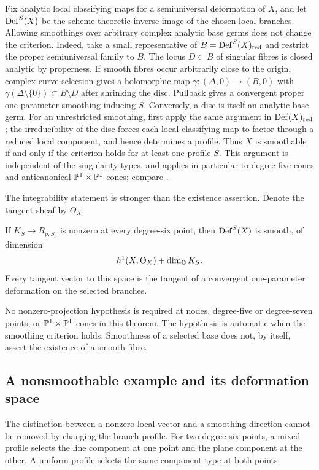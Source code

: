 Fix analytic local classifying maps for a semiuniversal deformation of
$X$, and let $\operatorname{Def}^S(X)$ be the scheme-theoretic inverse image of the
chosen local branches.  Allowing smoothings over arbitrary complex analytic
base germs does not change the criterion.  Indeed, take a small
representative of $B=\operatorname{Def}^S(X)_{\mathrm{red}}$ and restrict the
proper semiuniversal family to $B$.  The locus $D\subset B$ of singular
fibres is closed analytic by properness.  If smooth fibres occur
arbitrarily close to the origin, complex curve selection
\cite[Lem.~2.36]{LeMassey05} gives a holomorphic map
$\gamma:(\Delta,0)\to(B,0)$ with
$\gamma(\Delta\setminus\{0\})\subset B\setminus D$ after shrinking
the disc.  Pullback gives a convergent proper one-parameter smoothing
inducing $S$.  Conversely, a disc is itself an analytic base germ.
For an unrestricted smoothing, first apply the same argument in
$\operatorname{Def}(X)_{\mathrm{red}}$; the irreducibility of the disc forces each
local classifying map to factor through a reduced local component,
and hence determines a profile.  Thus $X$ is smoothable if and only if
the criterion holds for at least one profile $S$.  This argument is
independent of the singularity types, and applies in particular to
degree-five cones and anticanonical $\mathbb{P}^1\times\mathbb{P}^1$ cones;
compare \cite[proof of Cor.~6.7]{PaperIV}.

The integrability statement is stronger than the existence assertion.
Denote the tangent sheaf by $\Theta_X$.

\begin{thmletter}\label{thm:smoothintro}
If $K_S\to R_{p,S_p}$ is nonzero at every degree-six point, then
$\operatorname{Def}^S(X)$ is smooth, of dimension
\[
 h^1(X,\Theta_X)+\dim_{\mathbb{Q}}K_S.
\]
Every tangent vector to this space is the tangent of a convergent
one-parameter deformation on the selected branches.
\end{thmletter}

No nonzero-projection hypothesis is required at nodes, degree-five or degree-seven
points, or $\mathbb{P}^1\times\mathbb{P}^1$ cones in this theorem.  The hypothesis
is automatic when the smoothing
criterion holds.  Smoothness of a selected base does not, by itself,
assert the existence of a smooth fibre.



\subsection{A nonsmoothable example and its deformation space}
The distinction between a nonzero local vector and a smoothing direction
cannot be removed by changing the branch profile.
For two degree-six points, a mixed profile selects the line component
at one point and the plane component at the other.  A uniform profile
selects the same component type at both points.

